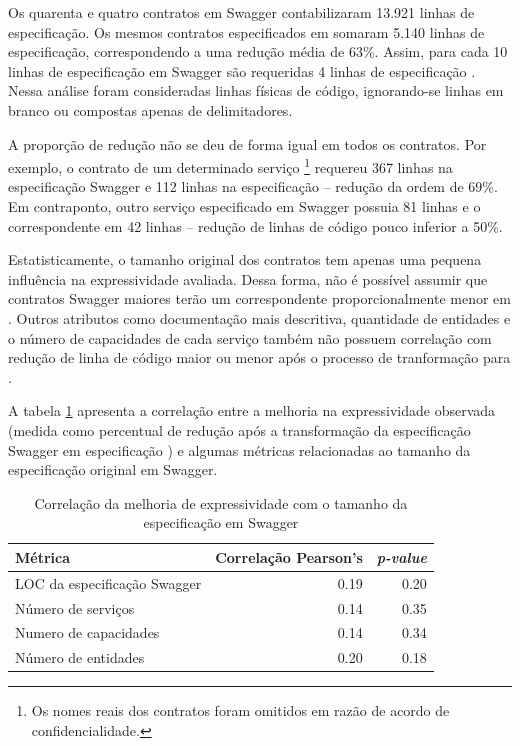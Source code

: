 Os quarenta e quatro contratos em Swagger contabilizaram 13.921 linhas de
especificação. Os mesmos contratos especificados em \neoidl{} somaram 5.140
linhas de especificação, correspondendo a uma redução média de 63\%. Assim, para
cada 10 linhas de especificação em Swagger são requeridas 4 linhas de
especificação \neoidl{}. Nessa análise foram consideradas linhas físicas de
código, ignorando-se linhas em branco ou compostas apenas de delimitadores.

A proporção de redução não se deu de forma igual em todos os contratos. Por
exemplo, o contrato de um determinado serviço \footnote{Os nomes reais dos
contratos foram omitidos em razão de acordo de confidencialidade.} requereu 367
linhas na especificação Swagger e 112 linhas na especificação \neoidl{} --
redução da ordem de 69\%.
Em contraponto, outro serviço especificado em Swagger possuia 81 linhas e o
correspondente em \neoidl{} 42 linhas -- redução de linhas de código pouco inferior a 50\%.

Estatisticamente, o tamanho original dos contratos tem apenas uma pequena
influência na expressividade avaliada. Dessa forma, não é possível assumir que
contratos Swagger maiores terão um correspondente proporcionalmente menor em
\neoidl{}.
Outros atributos como documentação mais descritiva, quantidade de entidades e o
número de capacidades de cada serviço também não possuem correlação com redução
de linha de código maior ou menor após o processo de tranformação para
\neoidl{}.

A tabela \ref{tab:size-corr} apresenta a correlação entre a
melhoria na expressividade observada (medida como percentual de redução após a
transformação da especificação Swagger em especificação \neoidl{}) e algumas
métricas relacionadas ao tamanho da especificação original em Swagger.

% 
% 

\begin{table}[htb]
\caption{Correlação da melhoria de expressividade com o tamanho da especificação
em Swagger}
\begin{center}
\begin{tabular}{lrr} 
\toprule
Métrica & Correlação Pearson's & \emph{p-value} \\ \hline \hline 
LOC da especificação Swagger & 0.19 &  0.20 \\ 
Número de serviços & 0.14 & 0.35 \\ 
Numero de capacidades & 0.14 & 0.34 \\
Número de entidades & 0.20 & 0.18 \\ \bottomrule 
\end{tabular} 
\end{center}
\label{tab:size-corr}
\end{table}





